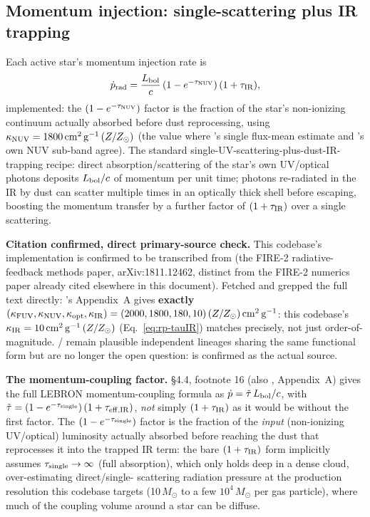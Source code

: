 \subsection{Momentum injection: single-scattering plus IR trapping}
\label{sec:rp-momentum}

Each active star's momentum injection rate is
\begin{equation}
  \dot p_{\rm rad} = \frac{L_{\rm bol}}{c}\,(1-e^{-\tau_{\rm NUV}})\,(1+\tau_{\rm IR}),
  \label{eq:rp-momentum-rate}
\end{equation}
implemented: the
$(1-e^{-\tau_{\rm NUV}})$ factor is the fraction of the star's non-ionizing
continuum actually absorbed before dust reprocessing, using
$\kappa_{\rm NUV}=1800\,{\rm cm^2\,g^{-1}}\,(Z/Z_\odot)$ (the value where
\citet{Hopkins2012a}'s single flux-mean estimate and
\citet{Hopkins2020}'s own NUV sub-band agree). The
standard single-UV-scattering-plus-dust-IR-trapping recipe: direct
absorption/scattering of the star's own UV/optical photons deposits
$L_{\rm bol}/c$ of momentum per unit time; photons re-radiated in the
IR by dust can scatter multiple times in an optically thick shell
before escaping, boosting the momentum transfer by a further factor of
$(1+\tau_{\rm IR})$ over a single scattering.

\textbf{Citation confirmed, direct primary-source check.}
This codebase's implementation is confirmed to be transcribed from
\citet{Hopkins2020} (the FIRE-2 radiative-feedback methods paper,
arXiv:1811.12462, distinct from the FIRE-2 numerics paper
\citet{Hopkins2018} already cited elsewhere in this document). Fetched
and grepped the full text directly: \citet{Hopkins2020}'s Appendix~A
gives \textbf{exactly}
$(\kappa_{\rm FUV},\kappa_{\rm NUV},\kappa_{\rm opt},\kappa_{\rm IR}) =
(2000, 1800, 180, 10)\,(Z/Z_\odot)\,{\rm cm^2\,g^{-1}}$: this
codebase's $\kappa_{\rm IR}=10\,{\rm cm^2\,g^{-1}}\,(Z/Z_\odot)$
(Eq.~\ref{eq:rp-tauIR}) matches precisely, not just order-of-magnitude.
\citet{Agertz2013}/\citet{Marinacci2019} remain plausible independent
lineages sharing the same functional form but are no longer the
open question: \citet{Hopkins2020} is confirmed as the actual source.

\textbf{The momentum-coupling factor.} \citet{Hopkins2020} \S4.4, footnote 16 (also
\citealt{Hopkins2014}, Appendix~A) gives the full LEBRON momentum-coupling
formula as $\dot p = \tilde\tau\,L_{\rm bol}/c$, with
$\tilde\tau = (1-e^{-\tau_{\rm single}})\,(1+\tau_{\rm eff,IR})$,
\emph{not} simply $(1+\tau_{\rm IR})$ as it would be without the first factor.
The $(1-e^{-\tau_{\rm single}})$ factor is the fraction of the
\emph{input} (non-ionizing UV/optical) luminosity actually absorbed before
reaching the dust that reprocesses it into the trapped IR term: the bare
$(1+\tau_{\rm IR})$ form implicitly assumes $\tau_{\rm single}\to\infty$ (full absorption),
which only holds deep in a dense cloud, over-estimating direct/single-
scattering radiation pressure at the production resolution this codebase
targets (10\,$M_\odot$ to a few $10^4\,M_\odot$ per gas particle), where
much of the coupling volume around a star can be diffuse.

